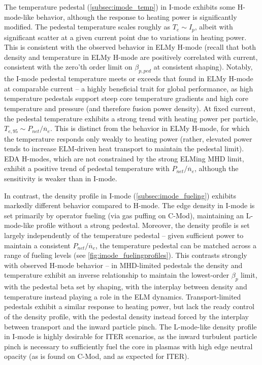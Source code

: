 The temperature pedestal (\cref{subsec:imode_temp}) in I-mode exhibits some H-mode-like behavior, although the response to heating power is significantly modified.  The pedestal temperature scales roughly as $T_e \sim I_p$, albeit with significant scatter at a given current point due to variations in heating power.  This is consistent with the observed behavior in ELMy H-mode (recall that both density and temperature in ELMy H-mode are positively correlated with current, consistent with the zero'th order limit on $\beta_{p,ped}$ at consistent shaping).  Notably, the I-mode pedestal temperature meets or exceeds that found in ELMy H-mode at comparable current -- a highly beneficial trait for global performance, as high temperature pedestals support steep core temperature gradients and high core temperature and pressure (and therefore fusion power density).  At fixed current, the pedestal temperature exhibits a strong trend with heating power per particle, $T_{e,95} \sim P_{net}/\overline{n}_e$.  This is distinct from the behavior in ELMy H-mode, for which the temperature responds only weakly to heating power (rather, elevated power tends to increase ELM-driven heat transport to maintain the pedestal limit).  EDA H-modes, which are not constrained by the strong ELMing MHD limit, exhibit a positive trend of pedestal temperature with $P_{net}/\overline{n}_e$, although the sensitivity is weaker than in I-mode.

In contrast, the density profile in I-mode (\cref{subsec:imode_fueling}) exhibits markedly different behavior compared to H-mode.  The edge density in I-mode is set primarily by operator fueling (via gas puffing on C-Mod), maintaining an L-mode-like profile without a strong pedestal.  Moreover, the density profile is set largely independently of the temperature pedestal -- given sufficient power to maintain a consistent $P_{net}/\overline{n}_e$, the temperature pedestal can be matched across a range of fueling levels (see \cref{fig:imode_fuelingprofiles}).  This contrasts strongly with observed H-mode behavior -- in MHD-limited pedestals the density and temperature exhibit an inverse relationship to maintain the lowest-order $\beta_p$ limit, with the pedestal beta set by shaping, with the interplay between density and temperature instead playing a role in the ELM dynamics.  Transport-limited pedestals exhibit a similar response to heating power, but lack the ready control of the density profile, with the pedestal density instead forced by the interplay between transport and the inward particle pinch.  The L-mode-like density profile in I-mode is highly desirable for ITER scenarios, as the inward turbulent particle pinch is necessary to sufficiently fuel the core in plasmas with high edge neutral opacity (as is found on C-Mod, and as expected for ITER).

